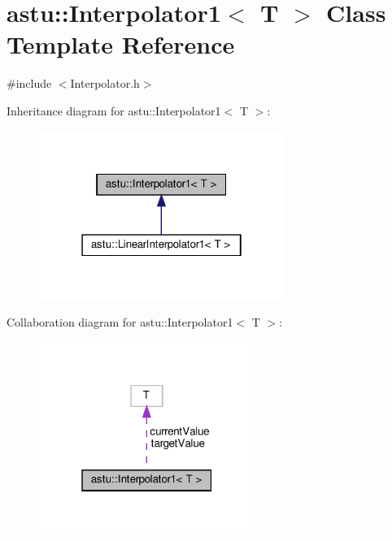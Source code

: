 \hypertarget{classastu_1_1Interpolator1}{}\section{astu\+:\+:Interpolator1$<$ T $>$ Class Template Reference}
\label{classastu_1_1Interpolator1}


{\ttfamily \#include $<$Interpolator.\+h$>$}



Inheritance diagram for astu\+:\+:Interpolator1$<$ T $>$\+:\nopagebreak
\begin{figure}[H]
\begin{center}
\leavevmode
\includegraphics[width=226pt]{classastu_1_1Interpolator1__inherit__graph}
\end{center}
\end{figure}


Collaboration diagram for astu\+:\+:Interpolator1$<$ T $>$\+:\nopagebreak
\begin{figure}[H]
\begin{center}
\leavevmode
\includegraphics[width=199pt]{classastu_1_1Interpolator1__coll__graph}
\end{center}
\end{figure}
